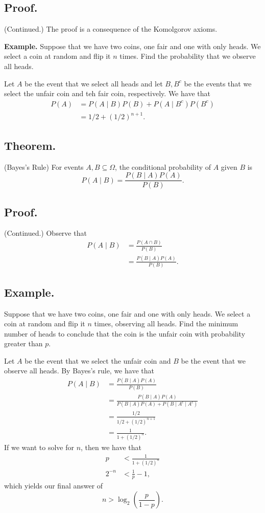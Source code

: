 \documentclass[titlepage]{article}
\begin{document}
\subsection{Proof.} (Continued.) The proof is a consequence of the Komolgorov axioms.

\textbf{Example.} Suppose that we have two coins, one fair and one with only heads. We select a coin at random and flip it $n$ times. Find the probability that we observe all heads.

Let $A$ be the event that we select all heads and let $B, B^{c}$ be the events that we select the unfair coin and teh fair coin, respectively. We have that 
\begin{align*}
    P(A) &= P(A \mid B)P(B) + P(A \mid B^{c})P(B^{c}) \\
         &= 1/2 + (1/2)^{n+1}.
\end{align*}

\subsection{Theorem.} (Bayes's Rule) For events $A, B \subseteq \Omega$, the conditional probability of $A$ given $B$ is 
$$P(A \mid B) = \frac{P(B \mid A)P(A)}{P(B)}.$$

\subsection{Proof.} (Continued.) Observe that 
\begin{align*}
    P(A \mid B) &= \frac{P(A \cap B)}{P(B)} \\
                &= \frac{P(B \mid A)P(A)}{P(B)}.
\end{align*}

\subsection{Example.} Suppose that we have two coins, one fair and one with only heads. We select a coin at random and flip it $n$ times, observing all heads. Find the minimum number of heads to conclude that the coin is the unfair coin with probability greater than $p$.

Let $A$ be the event that we select the unfair coin and $B$ be the event that we observe all heads. By Bayes's rule, we have that  
\begin{align*}
    P(A \mid B) &= \frac{P(B \mid A)P(A)}{P(B)} \\
                &= \frac{P(B \mid A)P(A)}{P(B \mid A)P(A) + P(B \mid A^{c} \mid A^{c})} \\
                &= \frac{1/2}{1/2 + (1/2)^{n+1}} \\
                &= \frac{1}{1 + (1/2)^{n}}.
\end{align*}
If we want to solve for $n$, then we have that 
\begin{align*}
    p &<\frac{1}{1 + (1/2)^{n}} \\
    2^{-n} &< \frac{1}{p} - 1,
\end{align*}
which yields our final answer of 
$$n > \log_{2}\left(\frac{p}{1-p}\right).$$
\end{document}
